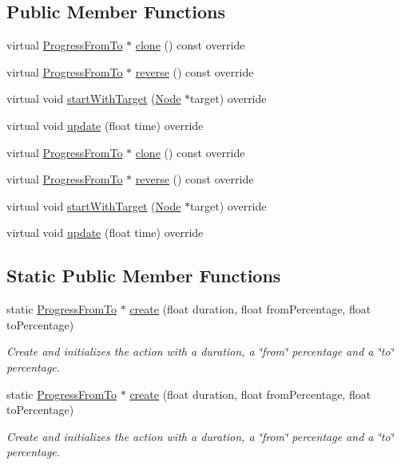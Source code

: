 \subsection*{Public Member Functions}
\begin{DoxyCompactItemize}
\item 
virtual \hyperlink{classProgressFromTo}{Progress\+From\+To} $\ast$ \hyperlink{classProgressFromTo_a0ac214f0a34b42f2d6c303a37e7026db}{clone} () const override
\item 
virtual \hyperlink{classProgressFromTo}{Progress\+From\+To} $\ast$ \hyperlink{classProgressFromTo_a328d31cfce627f6d086ce9a8329d7be3}{reverse} () const override
\item 
virtual void \hyperlink{classProgressFromTo_a27405d1d6988dc13852ff8a1c1fd6b2f}{start\+With\+Target} (\hyperlink{classNode}{Node} $\ast$target) override
\item 
virtual void \hyperlink{classProgressFromTo_aebb245e96342caf698903ebd33ff9421}{update} (float time) override
\item 
virtual \hyperlink{classProgressFromTo}{Progress\+From\+To} $\ast$ \hyperlink{classProgressFromTo_a86d0e65030755a5e7f96df76e8f87e2a}{clone} () const override
\item 
virtual \hyperlink{classProgressFromTo}{Progress\+From\+To} $\ast$ \hyperlink{classProgressFromTo_a78eb94326ecd704d53e0455d5f8341f5}{reverse} () const override
\item 
virtual void \hyperlink{classProgressFromTo_aeab6816a74d30e3ccd407b6c0e160db7}{start\+With\+Target} (\hyperlink{classNode}{Node} $\ast$target) override
\item 
virtual void \hyperlink{classProgressFromTo_a138ddd6382f15b8e1b3e05a10bf2667d}{update} (float time) override
\end{DoxyCompactItemize}
\subsection*{Static Public Member Functions}
\begin{DoxyCompactItemize}
\item 
static \hyperlink{classProgressFromTo}{Progress\+From\+To} $\ast$ \hyperlink{classProgressFromTo_a0e4155cef6bf6094f43d0c85b0f40b29}{create} (float duration, float from\+Percentage, float to\+Percentage)
\begin{DoxyCompactList}\small\item\em Create and initializes the action with a duration, a \char`\"{}from\char`\"{} percentage and a \char`\"{}to\char`\"{} percentage. \end{DoxyCompactList}\item 
static \hyperlink{classProgressFromTo}{Progress\+From\+To} $\ast$ \hyperlink{classProgressFromTo_a16babfefba10d5ce986b2ce550d23508}{create} (float duration, float from\+Percentage, float to\+Percentage)
\begin{DoxyCompactList}\small\item\em Create and initializes the action with a duration, a \char`\"{}from\char`\"{} percentage and a \char`\"{}to\char`\"{} percentage. \end{DoxyCompactList}\end{DoxyCompactItemize}
